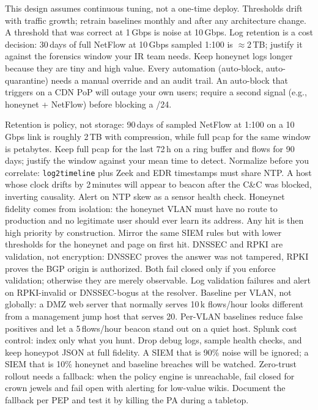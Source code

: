 \begin{remark}\label{rem:opnote}
This design assumes continuous tuning, not a one-time deploy. Thresholds drift with traffic growth; retrain baselines monthly and after any architecture change. A threshold that was correct at 1\,Gbps is noise at 10\,Gbps.
Log retention is a cost decision: 30\,days of full NetFlow at 10\,Gbps sampled 1:100 is $\approx$2\,TB; justify it against the forensics window your IR team needs. Keep honeynet logs longer because they are tiny and high value.
Every automation (auto-block, auto-quarantine) needs a manual override and an audit trail. An auto-block that triggers on a CDN PoP will outage your own users; require a second signal (e.g., honeynet + NetFlow) before blocking a /24.
\end{remark}
Retention is policy, not storage: 90\,days of sampled NetFlow at 1:100 on a 10\,Gbps link is roughly 2\,TB with compression, while full pcap for the same window is petabytes. Keep full pcap for the last 72\,h on a ring buffer and flows for 90\,days; justify the window against your mean time to detect.
Normalize before you correlate: \texttt{log2timeline} plus Zeek and EDR timestamps must share NTP. A host whose clock drifts by 2\,minutes will appear to beacon after the C\&C was blocked, inverting causality. Alert on NTP skew as a sensor health check.
Honeynet fidelity comes from isolation: the honeynet VLAN must have no route to production and no legitimate user should ever learn its address. Any hit is then high priority by construction. Mirror the same SIEM rules but with lower thresholds for the honeynet and page on first hit.
DNSSEC and RPKI are validation, not encryption: DNSSEC proves the answer was not tampered, RPKI proves the BGP origin is authorized. Both fail closed only if you enforce validation; otherwise they are merely observable. Log validation failures and alert on RPKI-invalid or DNSSEC-bogus at the resolver.
Baseline per VLAN, not globally: a DMZ web server that normally serves 10\,k flows/hour looks different from a management jump host that serves 20. Per-VLAN baselines reduce false positives and let a 5\,flows/hour beacon stand out on a quiet host.
Splunk cost control: index only what you hunt. Drop debug logs, sample health checks, and keep honeypot JSON at full fidelity. A SIEM that is 90\% noise will be ignored; a SIEM that is 10\% honeynet and baseline breaches will be watched.
Zero-trust rollout needs a fallback: when the policy engine is unreachable, fail closed for crown jewels and fail open with alerting for low-value wikis. Document the fallback per PEP and test it by killing the PA during a tabletop.
